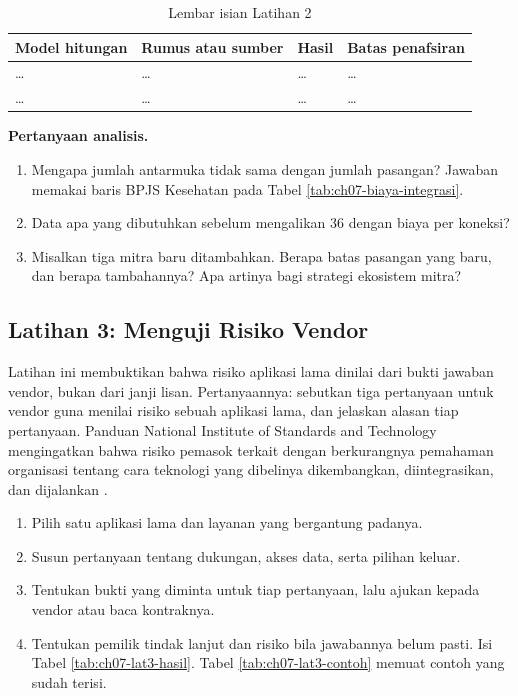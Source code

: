 \begin{table}[!htb]
  \centering
  \caption{Lembar isian Latihan 2}
  \label{tab:ch07-lat2-hasil}
  \small
  \begin{tabularx}{\textwidth}{>{\raggedright\arraybackslash}p{3.2cm}>{\raggedright\arraybackslash}p{2.6cm}>{\raggedright\arraybackslash}p{1.6cm}>{\raggedright\arraybackslash}X}
    \hline
    \textbf{Model hitungan} & \textbf{Rumus atau sumber} & \textbf{Hasil} & \textbf{Batas penafsiran} \\
    \hline
    \dots & \dots & \dots & \dots \\
    \hline
    \dots & \dots & \dots & \dots \\
    \hline
  \end{tabularx}
\end{table}

\textbf{Pertanyaan analisis.}

\begin{enumerate}
  \item Mengapa jumlah antarmuka tidak sama dengan jumlah pasangan? Jawaban memakai baris BPJS Kesehatan pada Tabel \ref{tab:ch07-biaya-integrasi}.
  \item Data apa yang dibutuhkan sebelum mengalikan 36 dengan biaya per koneksi?
  \item Misalkan tiga mitra baru ditambahkan. Berapa batas pasangan yang baru, dan berapa tambahannya? Apa artinya bagi strategi ekosistem mitra?
\end{enumerate}

\subsection*{Latihan 3: Menguji Risiko Vendor}

Latihan ini membuktikan bahwa risiko aplikasi lama dinilai dari bukti jawaban vendor, bukan dari janji lisan. Pertanyaannya: sebutkan tiga pertanyaan untuk vendor guna menilai risiko sebuah aplikasi lama, dan
jelaskan alasan tiap pertanyaan. Panduan National Institute of Standards and Technology mengingatkan bahwa risiko pemasok terkait dengan berkurangnya pemahaman organisasi tentang cara teknologi yang
dibelinya dikembangkan, diintegrasikan, dan dijalankan \cite{c07-nist800161}.

\begin{enumerate}
  \item Pilih satu aplikasi lama dan layanan yang bergantung padanya.
  \item Susun pertanyaan tentang dukungan, akses data, serta pilihan keluar.
  \item Tentukan bukti yang diminta untuk tiap pertanyaan, lalu ajukan kepada vendor atau baca kontraknya.
  \item Tentukan pemilik tindak lanjut dan risiko bila jawabannya belum pasti. Isi Tabel \ref{tab:ch07-lat3-hasil}. Tabel \ref{tab:ch07-lat3-contoh} memuat contoh yang sudah terisi.
\end{enumerate}


